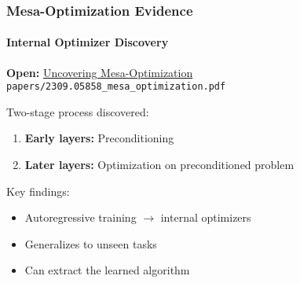 \documentclass[10pt,aspectratio=169]{beamer}
\begin{document}
\begin{frame}
\frametitle{Mesa-Optimization Evidence}
\framesubtitle{Internal Optimizer Discovery}

\begin{center}
\Large
\textbf{Open:} \href{papers/2309.05858_mesa_optimization.pdf}{\color{blue}Uncovering Mesa-Optimization}\\\small{\texttt{papers/2309.05858\_mesa\_optimization.pdf}}
\end{center}

\vspace{0.5cm}

Two-stage process discovered:
\begin{enumerate}
    \item \textbf{Early layers:} Preconditioning
    \item \textbf{Later layers:} Optimization on preconditioned problem
\end{enumerate}

\vspace{0.5cm}
Key findings:
\begin{itemize}
    \item Autoregressive training $\rightarrow$ internal optimizers
    \item Generalizes to unseen tasks
    \item Can extract the learned algorithm
\end{itemize}
\end{frame}

\end{document}
